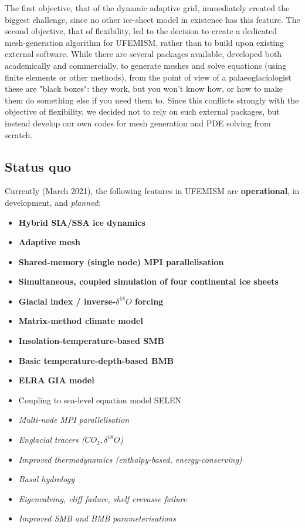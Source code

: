 \documentclass{article}
\begin{document}
The first objective, that of the dynamic adaptive grid, immediately created the biggest challenge, since no other ice-sheet model in existence has this feature. The second objective, that of flexibility, led to the decision to create a dedicated mesh-generation algorithm for UFEMISM, rather than to build upon existing external software. While there are several packages available, developed both academically and commercially, to generate meshes and solve equations (using finite elements or other methods), from the point of view of a palaeoglaciologist these are "black boxes": they work, but you won't know how, or how to make them do something else if you need them to. Since this conflicts strongly with the objective of flexibility, we decided not to rely on such external packages, but instead develop our own codes for mesh generation and PDE solving from scratch.

\subsection{Status quo}

Currently (March 2021), the following features in UFEMISM are \textbf{operational}, in development, and \textit{planned}:

\begin{itemize}

\item \textbf{Hybrid SIA/SSA ice dynamics}
\item \textbf{Adaptive mesh}
\item \textbf{Shared-memory (single node) MPI parallelisation}
\item \textbf{Simultaneous, coupled simulation of four continental ice sheets}
\item \textbf{Glacial index / inverse-$\delta^{18}O$ forcing}
\item \textbf{Matrix-method climate model}
\item \textbf{Insolation-temperature-based SMB}
\item \textbf{Basic temperature-depth-based BMB}
\item \textbf{ELRA GIA model}
\\
\item Coupling to sea-level equation model SELEN
\\
\item \textit{Multi-node MPI parallelisation}
\item \textit{Englacial tracers ($CO_2, \delta^{18}O$)}
\item \textit{Improved thermodynamics (enthalpy-based, energy-conserving)}
\item \textit{Basal hydrology}
\item \textit{Eigencalving, cliff failure, shelf crevasse failure}
\item \textit{Improved SMB and BMB parameterisations}

\end{itemize}
\end{document}
